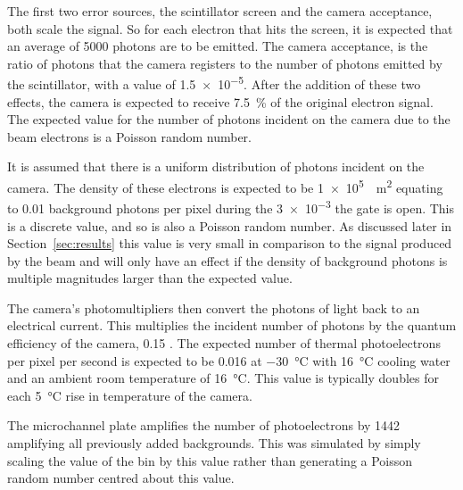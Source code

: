 
The first two error sources, the scintillator screen and the camera acceptance,
both scale the signal. So for each electron that hits the screen, it is
expected that an average of \num{5000} \cite{} photons are to be emitted. The
camera acceptance, is the ratio of photons that the camera registers to the
number of photons emitted by the scintillator, with a value of \num{1.5e-5}.
After the addition of these two effects, the camera is expected to receive
\SI{7.5}{\percent} of the original electron signal. The expected value for the
number of photons incident on the camera due to the beam electrons is a Poisson
random number.

It is assumed that there is a uniform distribution of photons incident on the
camera. The density of these electrons is expected to be
\SI{1e5}{\per\meter\squared} equating to \num{0.01} background photons per
pixel during the \SI{3e-3}{\seconds} the gate is open. This is a discrete
value, and so is also a Poisson random number. As discussed later in
Section~\ref{sec:results} this value is very small in comparison to the signal
produced by the beam and will only have an effect if the density of background
photons is multiple magnitudes larger than the expected value.

The camera's photomultipliers then convert the photons of light back to an
electrical current. This multiplies the incident number of photons by the
quantum efficiency of the camera, \num{0.15} \cite{}. The expected number of
thermal photoelectrons per pixel per second is expected to be \num{0.016} at
\SI{-30}{\celsius} with \SI{16}{\celsius} cooling water and an ambient room
temperature of \SI{16}{\celsius}. This value is typically doubles for each
\SI{5}{\celsius} rise in temperature of the camera.

The microchannel plate amplifies the number of photoelectrons by \num{1442}
amplifying all previously added backgrounds.
This was simulated by simply scaling the value of the bin by this value rather
than generating a Poisson random number centred about this value.

